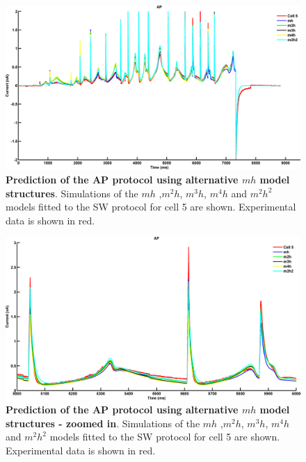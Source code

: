 \documentclass[11pt,a4paper,oneside]{article}
\begin{document}
\begin{figure}[ht]
\begin{center}
\includegraphics[scale=0.42]{Figures/Fig_mh_family_16713110_FP_sine_Wave_CP_ap.png}
\caption{\textbf{Prediction of the AP protocol using alternative $mh$ model structures}. Simulations of the $mh$ ,$m^2h$, $m^3h$, $m^4h$ and $m^2h^2$ models fitted to the SW protocol for cell 5 are shown. Experimental data is shown in red.} 
\label{Fig_mh_AP}
\end{center}
\end{figure}

\begin{figure}[hb]
\begin{center}
\includegraphics[scale=0.42]{Figures/Fig_mh_family_16713110_FP_sine_wave_CP_ap_zoom.png}
\caption{\textbf{Prediction of the AP protocol using alternative $mh$ model structures - zoomed in}.  Simulations of the $mh$ ,$m^2h$, $m^3h$, $m^4h$ and $m^2h^2$ models fitted to the SW protocol for cell 5 are shown. Experimental data is shown in red.} 
\label{Fig_mh_AP_Zoom}
\end{center}
\end{figure}
\end{document}
